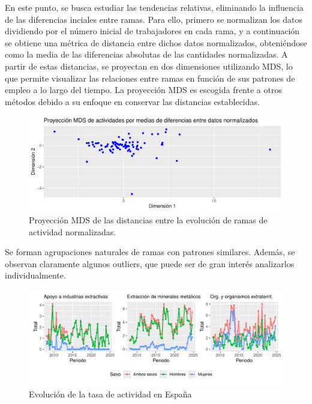 \documentclass[Universitat de
València,article,submit,moreauthors,pdftex]{Definitions/mdpi}
\begin{document}
En este punto, se busca estudiar las tendencias relativas, eliminando la
influencia de las diferencias inciales entre ramas. Para ello, primero
se normalizan los datos dividiendo por el número inicial de trabajadores
en cada rama, y a continuación se obtiene una métrica de distancia entre
dichos datos normalizados, obteniéndose como la media de las diferencias
absolutas de las cantidades normalizadas. A partir de estas distancias,
se proyectan en dos dimensiones utilizando MDS, lo que permite
visualizar las relaciones entre ramas en función de sus patrones de
empleo a lo largo del tiempo. La proyección MDS es escogida frente a
otros métodos debido a su enfoque en conservar las distancias
establecidas.

\begin{figure}

{\centering \includegraphics{ProyectoAED2024_files/figure-latex/unnamed-chunk-42-1} 

}

\caption{Proyección MDS de las distancias entre la evolución de ramas de actividad normalizadas.}\label{fig:unnamed-chunk-42}
\end{figure}

Se forman agrupaciones naturales de ramas con patrones similares.
Además, se observan claramente algunos outliers, que puede ser de gran
interés analizarlos individualmente.

\begin{figure}

{\centering \includegraphics{ProyectoAED2024_files/figure-latex/unnamed-chunk-43-1} 

}

\caption{Evolución de la tasa de actividad en España}\label{fig:unnamed-chunk-43}
\end{figure}
\end{document}
